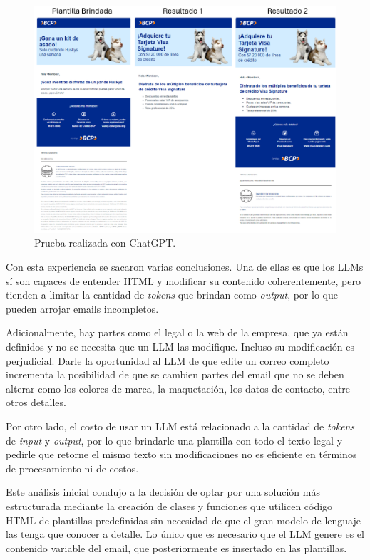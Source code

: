 \begin{figure}[!htpb]
     \centering
     \includegraphics[width=1\textwidth]{./Figures/Prueba_Inicial_Chatgpt.png}
    \caption{Prueba realizada con ChatGPT.}
    \label{fig:PruebaChatGPT}
\end{figure}

Con esta experiencia se sacaron varias conclusiones. Una de ellas es que los LLMs sí son capaces de entender HTML y modificar su contenido coherentemente, pero tienden a limitar la cantidad de \textit{tokens} que brindan como \textit{output}, por lo que pueden arrojar emails incompletos. 

Adicionalmente, hay partes como el legal o la web de la empresa, que ya están definidos y no se necesita que un LLM las modifique. Incluso su modificación es perjudicial. Darle la oportunidad al LLM de que edite un correo completo incrementa la posibilidad de que se cambien partes del email que no se deben alterar como los colores de marca, la maquetación, los datos de contacto, entre otros detalles.

Por otro lado, el costo de usar un LLM está relacionado a la cantidad de \textit{tokens} de \textit{input} y \textit{output}, por lo que brindarle una plantilla con todo el texto legal y pedirle que retorne el mismo texto sin modificaciones no es eficiente en términos de procesamiento ni de costos.

Este análisis inicial condujo a la decisión de optar por una solución más estructurada mediante la creación de clases y funciones que utilicen código HTML de plantillas predefinidas sin necesidad de que el gran modelo de lenguaje las tenga que conocer a detalle. Lo único que es necesario que el LLM genere es el contenido variable del email, que posteriormente es insertado en las plantillas.

